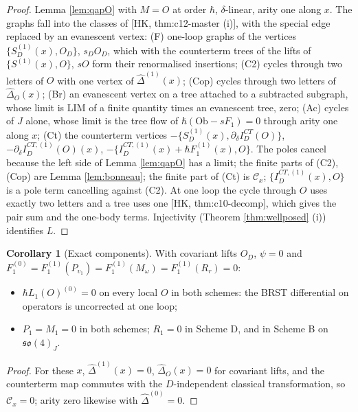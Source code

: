 \documentclass[11pt]{article}
\theoremstyle{definition}
\newtheorem{corollary}[definition]{Corollary}
\numberwithin{equation}{section}
\begin{document}
\begin{proof}
Lemma \ref{lem:qapO} with $M=O$ at order $\hbar$, $\delta$-linear, arity one along $x$. The graphs fall into the classes of [HK, thm:c12-master (i)], with the special edge replaced by an evanescent vertex: (F) one-loop graphs of the vertices $\{S^{(1)}_D(x),O_D\}$, $s_DO_D$, which with the counterterm trees of the lifts of $\{S^{(1)}(x),O\}$, $sO$ form their renormalised insertions; (C2) cycles through two letters of $O$ with one vertex of $\widehat\Delta^{(1)}(x)$; (Cop) cycles through two letters of $\widehat\Delta_O(x)$; (Br) an evanescent vertex on a tree attached to a subtracted subgraph, whose limit is $\mathrm{LIM}$ of a finite quantity times an evanescent tree, zero; (Ac) cycles of $J$ alone, whose limit is the tree flow of $\hbar(\mathrm{Ob}-sF_1)=0$ through arity one along $x$; (Ct) the counterterm vertices $-\{S^{(1)}_D(x),\partial_\delta I^{CT}_D(O)\}$, $-\partial_\delta I^{CT,(1)}_D(O)(x)$, $-\{I^{CT,(1)}_D(x)+\hbar F_1^{(1)}(x),O\}$. The poles cancel because the left side of Lemma \ref{lem:qapO} has a limit; the finite parts of (C2), (Cop) are Lemma \ref{lem:bonneau}; the finite part of (Ct) is $\mathcal C_x$; $\{I^{CT,(1)}_D(x),O\}$ is a pole term cancelling against (C2). At one loop the cycle through $O$ uses exactly two letters and a tree uses one [HK, thm:c10-decomp], which gives the pair sum and the one-body terms. Injectivity (Theorem \ref{thm:wellposed} (i)) identifies $L$.
\end{proof}

\begin{corollary}[Exact components]
\label{cor:exact}
With covariant lifts $O_D$, $\psi=0$ and $F^{(0)}_1=F^{(1)}_1(P_{v_1})=F^{(1)}_1(M_\omega)=F^{(1)}_1(R_r)=0$:
\begin{itemize}
\item $\hbar L_1(O)^{(0)}=0$ on every local $O$ in both schemes: the BRST differential on operators is uncorrected at one loop;
\item $P_1=M_1=0$ in both schemes; $R_1=0$ in Scheme D, and in Scheme B on $\mathfrak{so}(4)_J$.
\end{itemize}
\end{corollary}

\begin{proof}
For these $x$, $\widehat\Delta^{(1)}(x)=0$, $\widehat\Delta_O(x)=0$ for covariant lifts, and the counterterm map commutes with the $D$-independent classical transformation, so $\mathcal C_x=0$; arity zero likewise with $\widehat\Delta^{(0)}=0$.
\end{proof}
\end{document}
